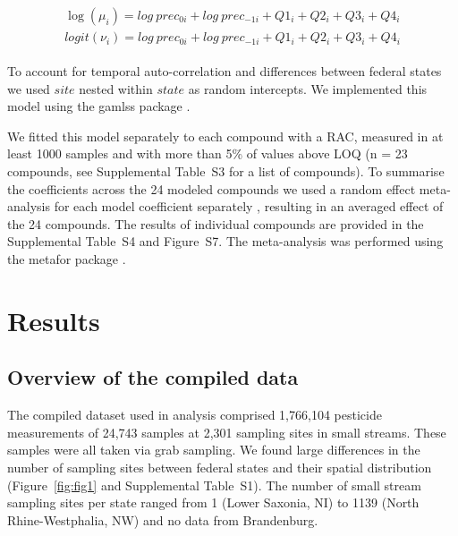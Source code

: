 \documentclass[journal=esthag,manuscript=article]{achemso}
\begin{document}
\begin{align}
\begin{split}
\log(\mu_{i}) = log~prec_{0 i} + log~prec_{-1 i} + Q1_{i} + Q2_{i}+Q3_{i}+Q4_{i}\\
logit(\nu_{i}) = log~prec_{0 i} + log~prec_{-1 i} + Q1_{i} + Q2_{i}+Q3_{i}+Q4_{i}
\end{split}
\label{eqn:eqn4}
\end{align}

To account for temporal auto-correlation and differences between federal states we used $site$ nested within $state$ as random intercepts.
We implemented this model using the gamlss package \cite{stasinopoulos_generalized_2007}. 

We fitted this model separately to each compound with a RAC, measured in at least 1000 samples and with more than 5\% of values above LOQ (n = 23 compounds, see Supplemental Table~S3 for a list of compounds). 
To summarise the coefficients across the 24 modeled compounds we used a random effect meta-analysis for each model coefficient separately \citep{harrison_getting_2011}, resulting in an averaged effect of the 24 compounds.
The results of individual compounds are provided in the Supplemental Table~S4 and Figure~S7.
The meta-analysis was performed using the metafor package \citep{Viechtbauer_2010}. 



\section{Results}
\subsection{Overview of the compiled data}

The compiled dataset used in analysis comprised 1,766,104 pesticide measurements of 24,743 samples at 2,301 sampling sites in small streams.  %
These samples were all taken via grab sampling.  
We found large differences in the number of sampling sites between federal states and their spatial distribution (Figure~\ref{fig:fig1} and Supplemental Table~S1). 
The number of small stream sampling sites per state ranged from 1 (Lower Saxonia, NI) to 1139 (North Rhine-Westphalia, NW) and no data from Brandenburg. 
\end{document}
